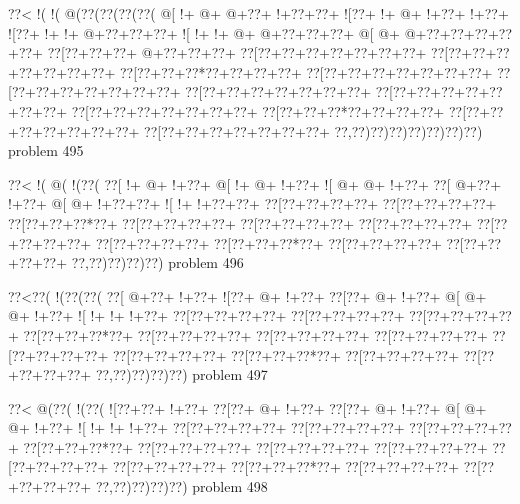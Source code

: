 \vbox{\vbox{\goo
\0??<\- !(\- !(\- @(\0??(\0??(\0??(\0??(
\- @[\- !+\- @+\- @+\0??+\- !+\0??+\0??+
\- ![\0??+\- !+\- @+\- !+\0??+\- !+\0??+
\- ![\0??+\- !+\- !+\- @+\0??+\0??+\0??+
\- ![\- !+\- !+\- @+\- @+\0??+\0??+\0??+
\- @[\- @+\- @+\0??+\0??+\0??+\0??+\0??+
\0??[\0??+\0??+\0??+\- @+\0??+\0??+\0??+
\0??[\0??+\0??+\0??+\0??+\0??+\0??+\0??+
\0??[\0??+\0??+\0??+\0??+\0??+\0??+\0??+
\0??[\0??+\0??+\0??*\0??+\0??+\0??+\0??+
\0??[\0??+\0??+\0??+\0??+\0??+\0??+\0??+
\0??[\0??+\0??+\0??+\0??+\0??+\0??+\0??+
\0??[\0??+\0??+\0??+\0??+\0??+\0??+\0??+
\0??[\0??+\0??+\0??+\0??+\0??+\0??+\0??+
\0??[\0??+\0??+\0??+\0??+\0??+\0??+\0??+
\0??[\0??+\0??+\0??*\0??+\0??+\0??+\0??+
\0??[\0??+\0??+\0??+\0??+\0??+\0??+\0??+
\0??[\0??+\0??+\0??+\0??+\0??+\0??+\0??+
\0??,\0??)\0??)\0??)\0??)\0??)\0??)\0??)
}
\hfil problem 495\hfil\break
}

\vbox{\vbox{\goo
\0??<\- !(\- @(\- !(\0??(
\0??[\- !+\- @+\- !+\0??+
\- @[\- !+\- @+\- !+\0??+
\- ![\- @+\- @+\- !+\0??+
\0??[\- @+\0??+\- !+\0??+
\- @[\- @+\- !+\0??+\0??+
\- ![\- !+\- !+\0??+\0??+
\0??[\0??+\0??+\0??+\0??+
\0??[\0??+\0??+\0??+\0??+
\0??[\0??+\0??+\0??*\0??+
\0??[\0??+\0??+\0??+\0??+
\0??[\0??+\0??+\0??+\0??+
\0??[\0??+\0??+\0??+\0??+
\0??[\0??+\0??+\0??+\0??+
\0??[\0??+\0??+\0??+\0??+
\0??[\0??+\0??+\0??*\0??+
\0??[\0??+\0??+\0??+\0??+
\0??[\0??+\0??+\0??+\0??+
\0??,\0??)\0??)\0??)\0??)
}
\hfil problem 496\hfil\break
}

\vbox{\vbox{\goo
\0??<\0??(\- !(\0??(\0??(
\0??[\- @+\0??+\- !+\0??+
\- ![\0??+\- @+\- !+\0??+
\0??[\0??+\- @+\- !+\0??+
\- @[\- @+\- @+\- !+\0??+
\- ![\- !+\- !+\- !+\0??+
\0??[\0??+\0??+\0??+\0??+
\0??[\0??+\0??+\0??+\0??+
\0??[\0??+\0??+\0??+\0??+
\0??[\0??+\0??+\0??*\0??+
\0??[\0??+\0??+\0??+\0??+
\0??[\0??+\0??+\0??+\0??+
\0??[\0??+\0??+\0??+\0??+
\0??[\0??+\0??+\0??+\0??+
\0??[\0??+\0??+\0??+\0??+
\0??[\0??+\0??+\0??*\0??+
\0??[\0??+\0??+\0??+\0??+
\0??[\0??+\0??+\0??+\0??+
\0??,\0??)\0??)\0??)\0??)
}
\hfil problem 497\hfil\break
}

\vbox{\vbox{\goo
\0??<\- @(\0??(\- !(\0??(
\- ![\0??+\0??+\- !+\0??+
\0??[\0??+\- @+\- !+\0??+
\0??[\0??+\- @+\- !+\0??+
\- @[\- @+\- @+\- !+\0??+
\- ![\- !+\- !+\- !+\0??+
\0??[\0??+\0??+\0??+\0??+
\0??[\0??+\0??+\0??+\0??+
\0??[\0??+\0??+\0??+\0??+
\0??[\0??+\0??+\0??*\0??+
\0??[\0??+\0??+\0??+\0??+
\0??[\0??+\0??+\0??+\0??+
\0??[\0??+\0??+\0??+\0??+
\0??[\0??+\0??+\0??+\0??+
\0??[\0??+\0??+\0??+\0??+
\0??[\0??+\0??+\0??*\0??+
\0??[\0??+\0??+\0??+\0??+
\0??[\0??+\0??+\0??+\0??+
\0??,\0??)\0??)\0??)\0??)
}
\hfil problem 498\hfil\break
}


